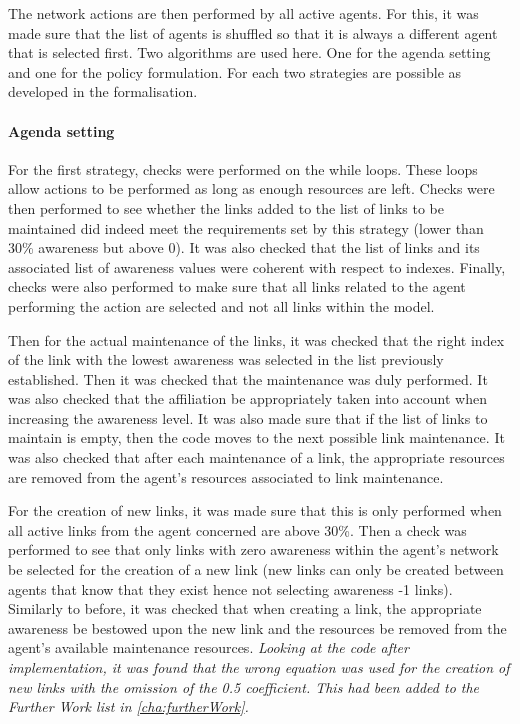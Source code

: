 The network actions are then performed by all active agents.  For this, it was made sure that the list of agents is shuffled so that it is always a different agent that is selected first. Two algorithms are used here. One for the agenda setting and one for the policy formulation. For each two strategies are possible as developed in the formalisation.

%
\paragraph{Agenda setting}

For the first strategy, checks were performed on the while loops. These loops allow actions to be performed as long as enough resources are left. Checks were then performed to see whether the links added to the list of links to be maintained did indeed meet the requirements set by this strategy (lower than 30\% awareness but above 0). It was also checked that the list of links and its associated list of awareness values were coherent with respect to indexes. Finally, checks were also performed to make sure that all links related to the agent performing the action are selected and not all links within the model.

Then for the actual maintenance of the links, it was checked that the right index of the link with the lowest awareness was selected in the list previously established. Then it was checked that the maintenance was duly performed. It was also checked that the affiliation be appropriately taken into account when increasing the awareness level. It was also made sure that if the list of links to maintain is empty, then the code moves to the next possible link maintenance. It was also checked that after each maintenance of a link, the appropriate resources are removed from the agent’s resources associated to link maintenance.

For the creation of new links, it was made sure that this is only performed when all active links from the agent concerned are above 30\%. Then a check was performed to see that only links with zero awareness within the agent’s network be selected for the creation of a new link (new links can only be created between agents that know that they exist hence not selecting awareness -1 links). Similarly to before, it was checked that when creating a link, the appropriate awareness be bestowed upon the new link and the resources be removed from the agent’s available maintenance resources. \emph{Looking at the code after implementation, it was found that the wrong equation was used for the creation of new links with the omission of the 0.5 coefficient. This had been added to the Further Work list in \autoref{cha:furtherWork}.} 

